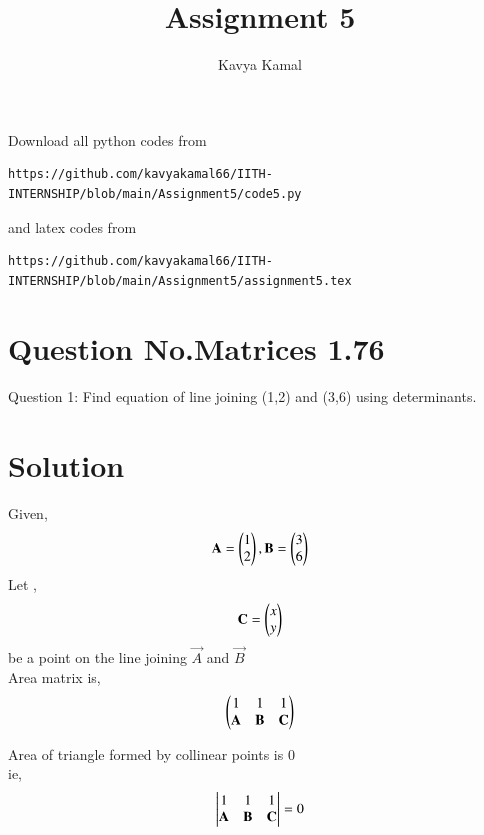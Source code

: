 \documentclass[journal,12pt,twocolumn]{IEEEtran}
\begin{document}
     \def\centbox#1{\makebox[0in]{#1}}
     \def\topbox#1{\raisebox{-\baselineskip}[0in][0in]{#1}}
     \def\midbox#1{\raisebox{-0.5\baselineskip}[0in][0in]{#1}}
\vspace{3cm}
\title{Assignment 5}
\author{Kavya Kamal}
\maketitle
\newpage
\bigskip
\renewcommand{\thefigure}{\theenumi}
\renewcommand{\thetable}{\theenumi}
Download all python codes from 
\begin{lstlisting}
https://github.com/kavyakamal66/IITH-INTERNSHIP/blob/main/Assignment5/code5.py
\end{lstlisting}
%
and latex codes from 
%
\begin{lstlisting}
https://github.com/kavyakamal66/IITH-INTERNSHIP/blob/main/Assignment5/assignment5.tex
\end{lstlisting}
%
\section{Question No.Matrices 1.76}
Question 1:
Find equation of line joining (1,2) and
(3,6) using determinants.
\section{Solution}
Given, 
	\begin{align}
	 \mathbf{A} = \begin{pmatrix}1\\2\end{pmatrix} , \mathbf{B} = \begin{pmatrix}3 \\ 6\end{pmatrix}
	\end{align}
	Let ,
	\begin{align}
	\mathbf{C} = \begin{pmatrix}x\\y\end{pmatrix}
	\end{align}
	be a point on the line joining $\vec{A}$ and $\vec{B}$\\
	Area matrix is,
	\begin{align}
	 \begin{pmatrix}1 & 1& 1 \\
	 \mathbf{A}&\mathbf{B}&\mathbf{C}\end{pmatrix}
	\end{align}

	Area of triangle formed by collinear points is 0\\
	ie,
	\begin{align}
	 \begin{vmatrix}1 & 1& 1 \\
	 \mathbf{A}&\mathbf{B}&\mathbf{C}\end{vmatrix}=0
	\end{align}
\end{document}
